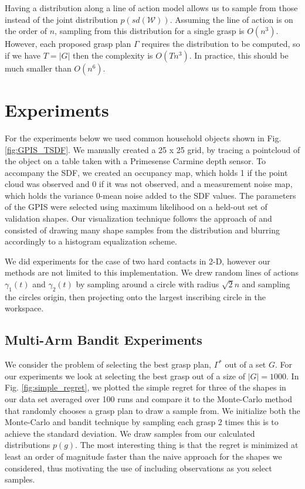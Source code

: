 \documentclass[letterpaper, 10 pt, conference]{ieeeconf}  %
\begin{document}
Having a distribution along a line of action model allows us to sample from those instead of the joint distribution $p(sd(\mathcal{W}))$. Assuming the line of action is on the order of $n$, sampling from this distribution for a single grasp is $O(n^3)$. However, each proposed grasp plan $\Gamma$ requires the distribution to be computed, so if we have $T=|G|$ then the complexity is $O(Tn^3)$. In practice, this should be much smaller than $O(n^6)$. 




\section{Experiments}
For the experiments below we used common household objects shown in Fig. \ref{fig:GPIS_TSDF}. We manually created a 25 x 25 grid, by tracing a pointcloud of the object on a table taken with a Primesense Carmine depth sensor. To accompany the SDF, we created an occupancy map, which holds 1 if the point cloud was observed and 0 if it was not observed, and a measurement noise map, which holds the variance 0-mean noise added to the SDF values. The parameters of the GPIS were selected using maximum likelihood on a held-out set of validation shapes. Our visualization technique follows the approach of \cite{jeffs} and consisted of drawing many shape samples from the distribution and blurring accordingly to a histogram equalization scheme. 

We did experiments for the case of two hard contacts in 2-D, however our methods are not limited to this implementation. We drew random lines of actions $\gamma_1(t)$ and $\gamma_2(t)$ by sampling around a circle with radius $\sqrt{2}n$ and sampling the circles origin, then projecting onto the largest inscribing circle in the workspace. 





\subsection{Multi-Arm Bandit Experiments}

We consider the problem of selecting the best grasp plan, $\Gamma^*$ out of a set $G$. For our experiments we look at selecting the best grasp out of a size of $|G| = 1000$. In Fig. \ref{fig:simple_regret}, we plotted the simple regret for three of the shapes in our data set averaged over 100 runs and compare it to the Monte-Carlo method that randomly chooses a grasp plan to draw a sample from. We initialize both the Monte-Carlo and bandit technique by sampling each grasp 2 times this is to achieve the standard deviation. We draw samples from our calculated distributions $p(g)$.  The most interesting thing is that the regret is minimized at least an order of magnitude faster than the naive approach for the shapes we considered, thus motivating the use of including observations as you select samples. 
\end{document}

